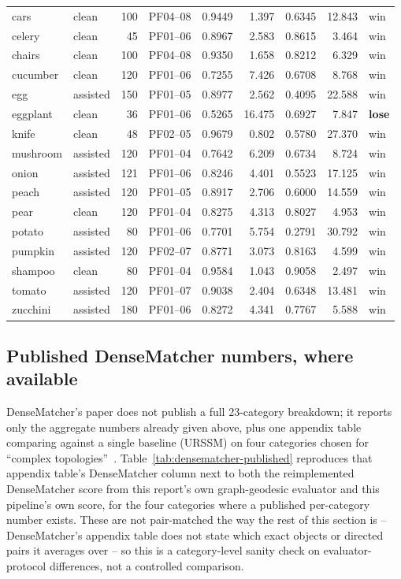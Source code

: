 \documentclass{article}
\begin{document}
\begin{longtable}{@{}l>{\raggedright\arraybackslash}p{1.75cm}rcrrrrl@{}}
cars & clean & 100 & PF04--08 & 0.9449 & 1.397 & 0.6345 & 12.843 & win \\
celery & clean & 45 & PF01--06 & 0.8967 & 2.583 & 0.8615 & 3.464 & win \\
chairs & clean & 100 & PF04--08 & 0.9350 & 1.658 & 0.8212 & 6.329 & win \\
cucumber & clean & 120 & PF01--06 & 0.7255 & 7.426 & 0.6708 & 8.768 & win \\
egg & assisted & 150 & PF01--05 & 0.8977 & 2.562 & 0.4095 & 22.588 & win \\
eggplant & clean & 36 & PF01--06 & 0.5265 & 16.475 & 0.6927 & 7.847 & \textbf{lose} \\
knife & clean & 48 & PF02--05 & 0.9679 & 0.802 & 0.5780 & 27.370 & win \\
mushroom & assisted & 120 & PF01--04 & 0.7642 & 6.209 & 0.6734 & 8.724 & win \\
onion & assisted & 121 & PF01--06 & 0.8246 & 4.401 & 0.5523 & 17.125 & win \\
peach & assisted & 120 & PF01--05 & 0.8917 & 2.706 & 0.6000 & 14.559 & win \\
pear & clean & 120 & PF01--04 & 0.8275 & 4.313 & 0.8027 & 4.953 & win \\
potato & assisted & 80 & PF01--06 & 0.7701 & 5.754 & 0.2791 & 30.792 & win \\
pumpkin & assisted & 120 & PF02--07 & 0.8771 & 3.073 & 0.8163 & 4.599 & win \\
shampoo & clean & 80 & PF01--04 & 0.9584 & 1.043 & 0.9058 & 2.497 & win \\
tomato & assisted & 120 & PF01--07 & 0.9038 & 2.404 & 0.6348 & 13.481 & win \\
zucchini & assisted & 180 & PF01--06 & 0.8272 & 4.341 & 0.7767 & 5.588 & win \\
\bottomrule
\end{longtable}
\endgroup

\subsection{Published DenseMatcher numbers, where available}

DenseMatcher's paper does not publish a full 23-category breakdown; it reports only the aggregate
numbers already given above, plus one appendix table comparing against a single baseline (URSSM) on
four categories chosen for ``complex topologies''~\cite{densematcher}. Table~\ref{tab:densematcher-published}
reproduces that appendix table's DenseMatcher column next to both the reimplemented DenseMatcher
score from this report's own graph-geodesic evaluator and this pipeline's own score, for the four
categories where a published per-category number exists. These are not pair-matched the way the
rest of this section is -- DenseMatcher's appendix table does not state which exact objects or
directed pairs it averages over -- so this is a category-level sanity check on evaluator-protocol
differences, not a controlled comparison.
\end{document}
